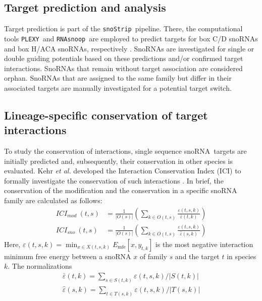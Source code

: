 \documentclass[preprint,3p,times]{elsarticle}
\newcommand{\sno}{snoRNA}
\newcommand{\cd}{box C/D snoRNA}
\newcommand{\haca}{box H/ACA snoRNA}
\newcommand{\snostrip}{\texttt{snoStrip}}
\newcommand{\plexy}{\texttt{PLEXY}}
\newcommand{\snoop}{\texttt{RNAsnoop}}
\begin{document}
\subsection{Target prediction and analysis}

Target prediction is part of the \snostrip\ pipeline. There, the
computational tools \plexy\ and \snoop\ are employed to predict
targets for \cd s and \haca s, respectively \cite{Kehr:2011,
  Tafer:2010}.  SnoRNAs are investigated for single or double guiding
potentials based on these predictions and/or confirmed target
interactions. SnoRNAs that remain without target association are
considered orphan. SnoRNAs that are assigned to the same family but
differ in their associated targets are manually investigated for
a potential target switch.

\subsection{Lineage-specific conservation of target interactions}
To study the conservation of interactions, single sequence \sno\ targets are initially predicted and, subsequently,
their conservation in other species is evaluated. Kehr \emph{et al.} developed the Interaction Conservation Index (ICI) to formally investigate the conservation of such interactions \cite{Kehr:2014}. In brief, the
conservation of the modification and the conservation in a specific
snoRNA family are calculated as follows:
\begin{equation}
  \begin{split}
    ICI_{mod}\:(t,s) & = \frac{1}{|O(s)|} \left( \sum_{k\in O(t,s)} \frac{\varepsilon(t,s,k)}{\bar\varepsilon(t,k)} \right) \\
    ICI_{sno}\:(t,s) & = \frac{1}{|O(s)|} \left( \sum_{k\in O(t,s)} \frac{\varepsilon(t,s,k)}{\hat\varepsilon(s,k)} \right)
  \end{split}
\end{equation}
Here, $ \varepsilon(t,s,k) = \min_{x\in X(t,s,k)}
E_{\textrm{mfe}}[x,y_{t,k}] $ is the most negative interaction minimum free
energy between a snoRNA $x$ of family $s$ and the target $t$ in species
$k$. The normalizations 
\begin{equation}
\begin{split}
\bar\varepsilon(t,k)=\sum_{s\in
  S(t,k)}\varepsilon(t,s,k)/|S(t,k)| \\
 \hat\varepsilon(s,k)=\sum_{t\in
  T(s,k)}\varepsilon(t,s,k)/|T(s,k)|
\end{split}
\end{equation}
\end{document}
